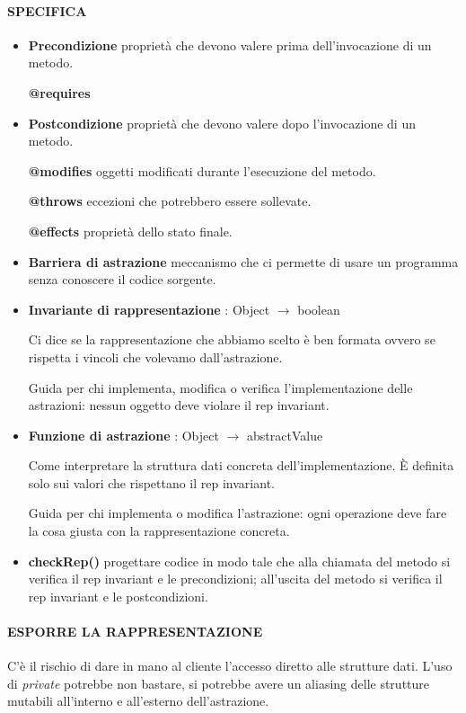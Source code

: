 \documentclass[a4paper, 12pt]{article}
\begin{document}
\paragraph{SPECIFICA}
\begin{itemize}
    \item \textbf{Precondizione} 
    proprietà che devono valere prima dell'invocazione di un metodo.
    
    \textbf{@requires}
    \item \textbf{Postcondizione}
    proprietà che devono valere dopo l'invocazione di un metodo.
    
    \textbf{@modifies} oggetti modificati durante l'esecuzione del metodo.
    
    \textbf{@throws} eccezioni che potrebbero essere sollevate.
    
    \textbf{@effects} proprietà dello stato finale.
    
    \item \textbf{Barriera di astrazione} meccanismo che ci permette di usare un programma
    senza conoscere il codice sorgente.
    \item \textbf{Invariante di rappresentazione} : Object $\rightarrow$ boolean
    
    Ci dice se la rappresentazione che abbiamo scelto è ben formata ovvero se rispetta
    i vincoli che volevamo dall'astrazione. 
    
    Guida per chi implementa, modifica o verifica l'implementazione delle astrazioni:
    nessun oggetto deve violare il rep invariant.
    
    \item \textbf{Funzione di astrazione} : Object $\rightarrow$ abstractValue
    
    Come interpretare la struttura dati concreta dell'implementazione. È definita solo
    sui valori che rispettano il rep invariant.
    
    Guida per chi implementa o modifica l'astrazione: ogni operazione deve fare la cosa
    giusta con la rappresentazione concreta.
    \item \textbf{checkRep()} progettare codice in modo tale che alla chiamata
    del metodo si verifica il rep invariant e le precondizioni; all'uscita del metodo si
    verifica il rep invariant e le postcondizioni.
\end{itemize}

\paragraph{ESPORRE LA RAPPRESENTAZIONE}
C'è il rischio di dare in mano al cliente l'accesso diretto alle strutture dati.
L'uso di \textit{private} potrebbe non bastare, si potrebbe avere un aliasing delle
strutture mutabili all'interno e all'esterno dell'astrazione.
\end{document}

